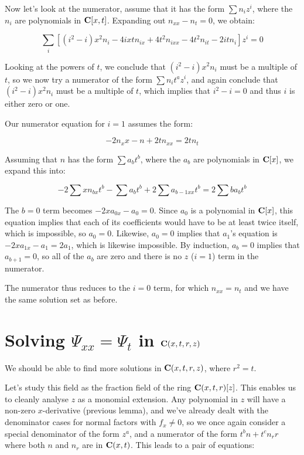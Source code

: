 \documentclass{article}
\newcommand{\C}{\ensuremath{{\bf C}}}
\begin{document}
Now let's look at the numerator, assume that it has the form $\sum n_i z^i$, where the $n_i$
are polynomials in $\C[x,t]$.  Expanding out $n_{xx} - n_t = 0$, we obtain:

$$\sum_i \left[ (i^{2} -i)x^{2}n_i -4ixtn_{ix} +4t^{2}n_{ixx} -4t^{2}n_{it} -2itn_i \right] z^i = 0$$

Looking at the powers of $t$, we conclude that $(i^{2} -i)x^{2}n_i$ must be a multiple
of $t$, so we now try a numerator of the form $\sum n_i t^a z^i$, and again
conclude that $(i^2-i) x^2 n_i$ must be a multiple of $t$, which implies that $i^2-i=0$
and thus $i$ is either zero or one.

Our numerator equation for $i=1$ assumes the form:

$$-2n_x x - n + 2 t n_{xx} = 2 t n_t$$

Assuming that $n$ has the form $\sum a_b t^b$, where the $a_b$ are polynomials in
$\C[x]$, we expand this into:

$$-2\sum x n_{bx} t^b - \sum a_b t^b + 2 \sum a_{b-1xx} t^{b} = 2 \sum b a_b t^b$$

The $b=0$ term becomes $-2xa_{0x} - a_0 = 0$.  Since $a_0$ is a polynomial
in $\C[x]$, this equation implies that each of its coefficients would have
to be at least twice itself, which is impossible, so $a_0=0$.  Likewise,
$a_0=0$ implies that $a_1$'s equation is $-2xa_{1x}-a_1=2a_1$, which is
likewise impossible.  By induction, $a_b=0$ implies that $a_{b+1}=0$,
so all of the $a_b$ are zero and there is no $z$ ($i=1$) term in
the numerator.

The numerator thus reduces to the $i=0$ term, for which $n_{xx}=n_t$
and we have the same solution set as before.

\vfill\eject
\section*{Solving $\Psi_{xx}=\Psi_t$ in $\C(x,t,r,z)$}

We should be able to find more solutions in $\C(x,t,r,z)$, where $r^2=t$.

Let's study this field as the fraction field of the ring
$\C(x,t,r)[z]$.  This enables us to cleanly analyse $z$ as a monomial
extension.  Any polynomial in $z$ will have a non-zero $x$-derivative
(previous lemma), and we've already dealt with the denominator cases for
normal factors with $f_x \ne 0$, so we once again consider a special
denominator of the form $z^a$, and a numerator of the form $t^b n +
t^c n_r r$ where both $n$ and $n_r$ are in $\C(x,t)$.  This leads
to a pair of equations:
\end{document}
